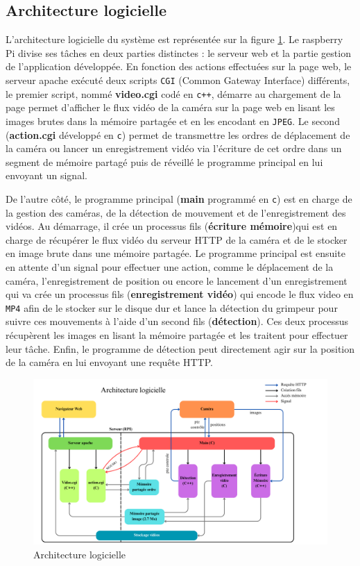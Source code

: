 \documentclass[a4paper, 11pt, french]{article}
\begin{document}
\subsection{Architecture logicielle}
L'architecture logicielle du système est représentée sur la figure \ref{fig:architectureLogicielle}. Le raspberry Pi divise ses tâches en deux parties distinctes : le serveur web et la partie gestion de l'application développée. En fonction des actions effectuées sur la page web, le serveur apache exécuté deux scripts \texttt{CGI} (Common Gateway Interface) différents, le premier script, nommé \textbf{video.cgi} codé en \texttt{c++}, démarre au chargement de la page permet d'afficher le flux vidéo de la caméra sur la page web en lisant les images brutes dans la mémoire partagée et en les encodant en \texttt{JPEG}. Le second (\textbf{action.cgi} développé en \texttt{c}) permet de transmettre les ordres de déplacement de la caméra ou lancer un enregistrement vidéo via l'écriture de cet ordre dans un segment de mémoire partagé puis de réveillé le programme principal en lui envoyant un signal. 


De l'autre côté, le programme principal (\textbf{main} programmé en \texttt{c}) est en charge de la gestion des caméras, de la détection de mouvement et de l'enregistrement des vidéos. Au démarrage, il crée un processus fils (\textbf{écriture mémoire})qui est en charge de récupérer le flux vidéo du serveur HTTP de la caméra et de le stocker en image brute dans une mémoire partagée. Le programme principal est ensuite en attente d'un signal pour effectuer une action, comme le déplacement de la caméra, l'enregistrement de position ou encore le lancement d'un enregistrement qui va crée un processus fils (\textbf{enregistrement vidéo}) qui encode le flux video en \texttt{MP4} afin de le stocker sur le disque dur et lance la détection du grimpeur pour suivre ces mouvements à l'aide d'un second fils (\textbf{détection}). Ces deux processus récupèrent les images en lisant la mémoire partagée et les traitent pour effectuer leur tâche. Enfin, le programme de détection peut directement agir sur la position de la caméra en lui envoyant une requête HTTP.


\begin{figure}[!ht]
  \centering
  \includegraphics[width=\textwidth]{architectureLogicielle.png}
  \caption{Architecture logicielle}
  \label{fig:architectureLogicielle}
\end{figure}
\end{document}
